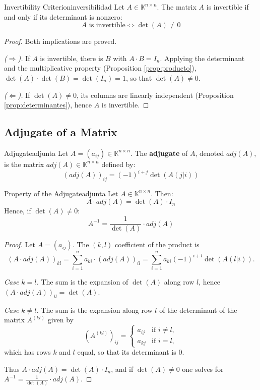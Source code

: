 \documentclass[11pt, a4paper]{article}
\begin{document}
\begin{proposicion}{Invertibility Criterion}{inversibilidad}
Let $A \in \mathbb{K}^{n \times n}$. The matrix $A$ is invertible if and only if its determinant is nonzero:
\[
A \text{ is invertible} \iff \det(A) \neq 0
\]
\end{proposicion}

\begin{proof}
Both implications are proved.

\textit{($\Rightarrow$).} If $A$ is invertible, there is $B$ with $A \cdot B = I_n$. Applying the determinant and the multiplicative property (Proposition \ref{prop:producto}), $\det(A) \cdot \det(B) = \det(I_n) = 1$, so that $\det(A) \neq 0$.

\textit{($\Leftarrow$).} If $\det(A) \neq 0$, its columns are linearly independent (Proposition \ref{prop:determinantes}), hence $A$ is invertible.
\end{proof}

\subsection{Adjugate of a Matrix}

\begin{definicion}{Adjugate}{adjunta}
Let $A=(a_{ij}) \in \mathbb{K}^{n \times n}$. The \textbf{adjugate} of $A$, denoted $adj(A)$, is the matrix $adj(A) \in \mathbb{K}^{n \times n}$ defined by:
\[
(adj(A))_{ij} = (-1)^{i+j} \det(A(j|i))
\]
\end{definicion}

\begin{proposicion}{Property of the Adjugate}{adjunta}
Let $A \in \mathbb{K}^{n \times n}$. Then:
\[ A \cdot adj(A) = \det(A) \cdot I_n \]
Hence, if $\det(A) \neq 0$:
\[ A^{-1} = \frac{1}{\det(A)} \cdot adj(A) \]
\end{proposicion}

\begin{proof}
Let $A = (a_{ij})$. The $(k,l)$ coefficient of the product is
\[
(A \cdot adj(A))_{kl} = \sum_{i=1}^{n} a_{ki} \cdot (adj(A))_{il} = \sum_{i=1}^{n} a_{ki} (-1)^{i+l} \det(A(l|i)).
\]

\textit{Case $k = l$.} The sum is the expansion of $\det(A)$ along row $l$, hence $(A \cdot adj(A))_{ll} = \det(A)$.

\textit{Case $k \neq l$.} The sum is the expansion along row $l$ of the determinant of the matrix $A^{(kl)}$ given by
\[
(A^{(kl)})_{ij} = \begin{cases} a_{ij} & \text{if } i \neq l, \\ a_{kj} & \text{if } i = l, \end{cases}
\]
which has rows $k$ and $l$ equal, so that its determinant is $0$.

Thus $A \cdot adj(A) = \det(A) \cdot I_n$, and if $\det(A) \neq 0$ one solves for $A^{-1} = \frac{1}{\det(A)} \cdot adj(A)$.
\end{proof}
\end{document}
